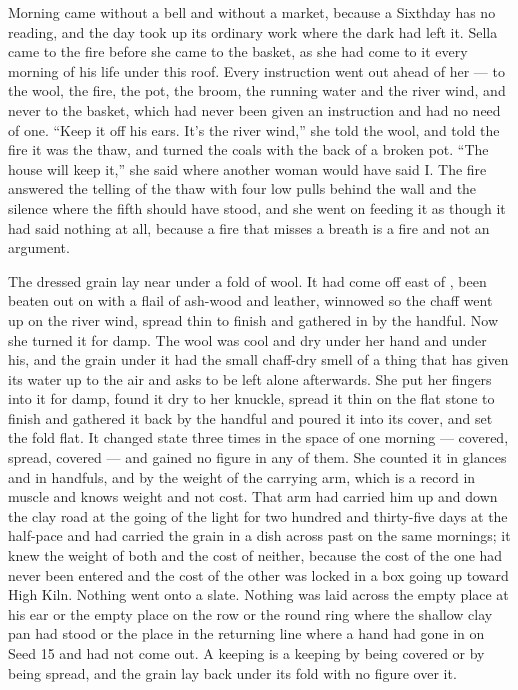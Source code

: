 \scenebreak

Morning came without a bell and without a market, because a Sixthday has no reading, and the day took up its ordinary work where the dark had left it. Sella came to the fire before she came to the basket, as she had come to it every morning of his life under this roof. Every instruction went out ahead of her --- to the wool, the fire, the pot, the broom, the running water and the river wind, and never to the basket, which had never been given an instruction and had no need of one. “Keep it off his ears. It's the river wind,” she told the wool, and told the fire it was the thaw, and turned the coals with the back of a broken pot. “The house will keep it,” she said where another woman would have said I. The fire answered the telling of the thaw with four low pulls behind the wall and the silence where the fifth should have stood, and she went on feeding it as though it had said nothing at all, because a fire that misses a breath is a fire and not an argument.

The dressed grain lay near  under a fold of wool. It had come off  east of , been beaten out on  with a flail of ash-wood and leather, winnowed so the chaff went up on the river wind, spread thin to finish and gathered in by the handful. Now she turned it for damp. The wool was cool and dry under her hand and under his, and the grain under it had the small chaff-dry smell of a thing that has given its water up to the air and asks to be left alone afterwards. She put her fingers into it for damp, found it dry to her knuckle, spread it thin on the flat stone to finish and gathered it back by the handful and poured it into its cover, and set the fold flat. It changed state three times in the space of one morning --- covered, spread, covered --- and gained no figure in any of them. She counted it in glances and in handfuls, and by the weight of the carrying arm, which is a record in muscle and knows weight and not cost. That arm had carried him up and down the clay road at the going of the light for two hundred and thirty-five days at the half-pace and had carried the grain in a dish across  past  on the same mornings; it knew the weight of both and the cost of neither, because the cost of the one had never been entered and the cost of the other was locked in a box going up toward High Kiln. Nothing went onto a slate. Nothing was laid across the empty place at his ear or the empty place on the row or the round ring where the shallow clay pan had stood or the place in the returning line where a hand had gone in on Seed 15 and had not come out. A keeping is a keeping by being covered or by being spread, and the grain lay back under its fold with no figure over it.

